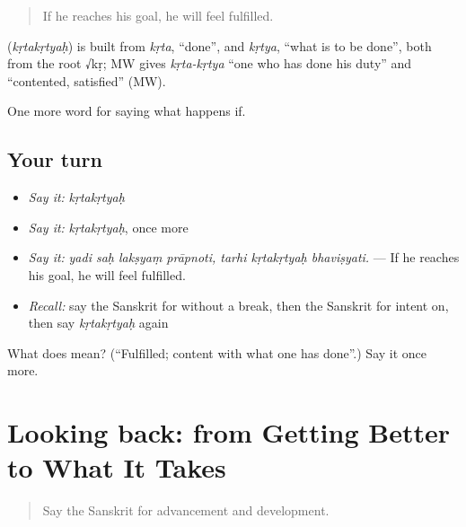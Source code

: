 \begin{quote}
If he reaches his goal, he will feel fulfilled.
\end{quote}

\begin{cousinweb}
\textbf{} (\emph{kṛtakṛtyaḥ}) is built from \emph{kṛta}, \textquotedblleft{}done\textquotedblright{}, and \emph{kṛtya}, \textquotedblleft{}what is to be done\textquotedblright{}, both from the root √kṛ; MW gives \emph{kṛta-kṛtya} \textquotedblleft{}one who has done his duty\textquotedblright{} and \textquotedblleft{}contented, satisfied\textquotedblright{} (MW).
\end{cousinweb}

\begin{grammarlens}[title={What you've built}]
One more word for saying what happens if.
\end{grammarlens}

\subsection*{Your turn}
\begin{itemize}
\raggedright
  \item \emph{Say it:} \emph{kṛtakṛtyaḥ}
  \item \emph{Say it:} \emph{kṛtakṛtyaḥ}, once more
  \item \emph{Say it:} \emph{yadi saḥ lakṣyaṃ prāpnoti, tarhi kṛtakṛtyaḥ bhaviṣyati.} — If he reaches his goal, he will feel fulfilled.
  \item \emph{Recall:} say the Sanskrit for without a break, then the Sanskrit for intent on, then say \emph{kṛtakṛtyaḥ} again
\end{itemize}

\begin{tcolorbox}[breakable,colback=teal!4,colframe=teal!35!black,title={Before you move on}]
What does  mean? (\textquotedblleft{}Fulfilled; content with what one has done\textquotedblright{}.) Say it once more.
\end{tcolorbox}
\section[(dialogue)]{Looking back: from Getting Better to What It Takes}

\label{lesson:SA-R393-review-387-393}



\begin{quote}
Say the Sanskrit for advancement and development.
\end{quote}

